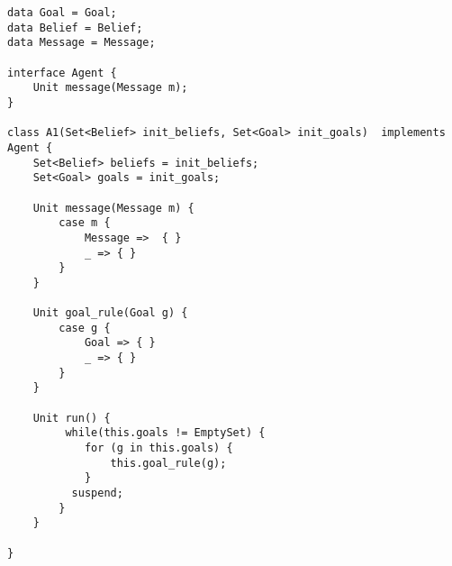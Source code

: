 \begin{lstlisting}[caption= Generic Agent Model, label=list:Agent]
data Goal = Goal;
data Belief = Belief;
data Message = Message;

interface Agent {
	Unit message(Message m);
}

class A1(Set<Belief> init_beliefs, Set<Goal> init_goals)  implements Agent {
	Set<Belief> beliefs = init_beliefs;
	Set<Goal> goals = init_goals;
	
	Unit message(Message m) {
		case m { 
			Message =>  { }
			_ => { }
		}
	}
	
	Unit goal_rule(Goal g) {
		case g {
			Goal => { }
			_ => { }
		}
	}
	
	Unit run() {
		 while(this.goals != EmptySet) {
  		    for (g in this.goals) {
		        this.goal_rule(g);
		    }
		  suspend;
		}
	}

}

\end{lstlisting}









%
%
%
%	


